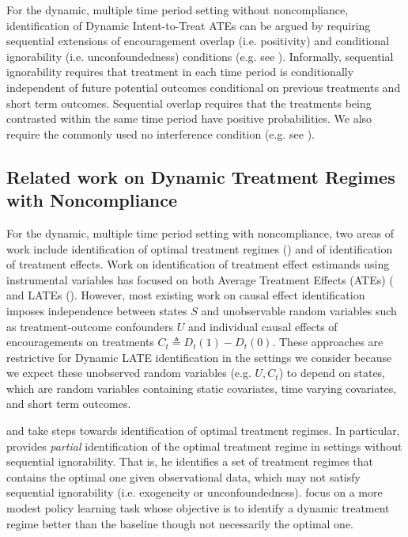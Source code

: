 For the dynamic, multiple time period setting without noncompliance, identification of Dynamic Intent-to-Treat ATEs can be argued by requiring sequential extensions of encouragement overlap (i.e. positivity) and conditional ignorability (i.e. unconfoundedness) conditions (e.g. see \cite{murphy2003optimal,robins1986new}).
Informally, sequential ignorability requires that treatment in each time period is conditionally independent of future potential outcomes conditional on previous treatments and short term outcomes.
Sequential overlap requires that the treatments being contrasted within the same time period have positive probabilities.
We also require the commonly used no interference condition (e.g. see \cite{neyman1935statistical,rubin1990comment,imbens2015causal}).

\subsection{Related work on Dynamic Treatment Regimes with Noncompliance}

For the dynamic, multiple time period setting with noncompliance, two areas of work include identification of optimal treatment regimes (\cite{han2023optimal,chen2023estimating}) and of identification of treatment effects.
Work on identification of treatment effect estimands using instrumental variables has focused on both Average Treatment Effects (ATEs) (\cite{han2021identification,heckman2007dynamic,heckman2016dynamic,michael2023instrumental,cui2023instrumental} and LATEs (\cite{miquel2002identification}).
However, most existing work on causal effect identification imposes independence between states $S$ and unobservable random variables such as treatment-outcome confounders $U$ and individual causal effects of encouragements on treatments $C_t \triangleq D_t(1) - D_t(0)$.
These approaches are restrictive for Dynamic LATE identification in the settings we consider because we expect these unobserved random variables (e.g. $U, C_t$)
to depend on states, which are random variables containing static covariates, time varying covariates, and short term outcomes.



\cite{han2023optimal} and \cite{chen2023estimating} take steps towards identification of optimal treatment regimes.
In particular, \cite{han2023optimal} provides \textit{partial} identification of the optimal treatment regime in settings without sequential ignorability.
That is, he identifies a set of treatment regimes that contains the optimal one given observational data, which may not satisfy sequential ignorability (i.e. exogeneity or unconfoundedness).
\cite{chen2023estimating} focus on a more modest policy learning task whose objective is to identify a dynamic treatment regime better than the baseline though not necessarily the optimal one.

